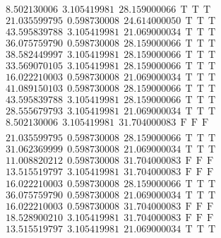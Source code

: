 \documentclass[10pt,a4paper]{article}
\begin{document}
\begin{itemize}
\begin{displaymath}
{\begin{aligned}
& 8.502130006 ~~   3.105419981 ~~  28.159000066  ~~\mathrm{T  ~~ T  ~~ T } \\ 
&21.035599795 ~~   0.598730008 ~~  24.614000050  ~~\mathrm{T  ~~ T  ~~ T } \\ 
&43.595839788 ~~   3.105419981 ~~  21.069000034  ~~\mathrm{T  ~~ T  ~~ T } \\ 
&36.075759790 ~~   0.598730008 ~~  28.159000066  ~~\mathrm{T  ~~ T  ~~ T } \\ 
&38.582449997 ~~   3.105419981 ~~  28.159000066  ~~\mathrm{T  ~~ T  ~~ T } \\ 
&33.569070105 ~~   3.105419981 ~~  28.159000066  ~~\mathrm{T  ~~ T  ~~ T } \\ 
&16.022210003 ~~   0.598730008 ~~  21.069000034  ~~\mathrm{T  ~~ T  ~~ T } \\ 
&41.089150103 ~~   0.598730008 ~~  28.159000066  ~~\mathrm{T  ~~ T  ~~ T } \\ 
&43.595839788 ~~   3.105419981 ~~  28.159000066  ~~\mathrm{T  ~~ T  ~~ T } \\ 
&28.555679793 ~~   3.105419981 ~~  21.069000034  ~~\mathrm{T  ~~ T  ~~ T } \\ 
& 8.502130006 ~~   3.105419981 ~~  31.704000083  ~~\mathrm{F  ~~ F  ~~  F} \\ 
				\end{aligned}
			}
		\end{displaymath}
		\begin{displaymath}
			\boxed{
				\begin{aligned}
&21.035599795 ~~   0.598730008 ~~  28.159000066  ~~\mathrm{T  ~~ T  ~~ T } \\ 
&31.062369999 ~~   0.598730008 ~~  21.069000034  ~~\mathrm{T  ~~ T  ~~ T } \\ 
&11.008820212 ~~   0.598730008 ~~  31.704000083  ~~\mathrm{F  ~~ F  ~~  F} \\ 
&13.515519797 ~~   3.105419981 ~~  31.704000083  ~~\mathrm{F  ~~ F  ~~  F} \\ 
&16.022210003 ~~   0.598730008 ~~  28.159000066  ~~\mathrm{T  ~~ T  ~~ T } \\ 
&36.075759790 ~~   0.598730008 ~~  21.069000034  ~~\mathrm{T  ~~ T  ~~ T } \\ 
&16.022210003 ~~   0.598730008 ~~  31.704000083  ~~\mathrm{F  ~~ F  ~~  F} \\ 
&18.528900210 ~~   3.105419981 ~~  31.704000083  ~~\mathrm{F  ~~ F  ~~  F} \\ 
&13.515519797 ~~   3.105419981 ~~  21.069000034  ~~\mathrm{T  ~~ T  ~~ T } \\ 

\end{aligned}}
\end{displaymath}
\end{itemize}
\end{document}
